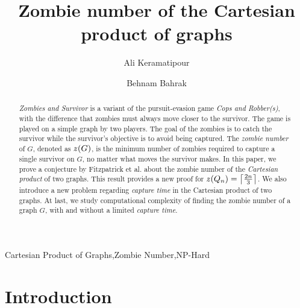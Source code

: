 \documentclass[1p]{elsarticle}
\DeclarePairedDelimiter\ceil{\lceil}{\rceil} \DeclarePairedDelimiter\floor{\lfloor}{\rfloor}
\newcommand{\zn}{\ooalign{$z$\cr\hfil\rule[.5ex]{.2em}{.08ex}\hfil\cr}}
\begin{document}
	
	\begin{frontmatter}
		
		\title{Zombie number of the Cartesian product of graphs}
		
		
		\author{Ali Keramatipour}
		
		\author{Behnam Bahrak}
		
		\address{School of Electrical and Computer Engineering, College of Engineering, University of Tehran, Tehran, Iran}
		
		\begin{abstract}
		{\it Zombies and Survivor} is a variant of the pursuit-evasion game {\it Cops and Robber(s)}, with the
		difference that zombies must always move closer to the survivor. The game is played on a simple graph by two
		players. The goal of the zombies is to catch the survivor while the survivor's objective is to avoid being
		captured. The {\it zombie number} of $G$, denoted as $\zn(G)$, is the minimum number of zombies required to
		capture a single survivor on $G$, no matter what moves the survivor makes. In this paper, we prove a conjecture
		by Fitzpatrick et al.\cite{Fitz16} about the zombie number of the {\it Cartesian product} of two graphs. This
		result provides a new proof for $\zn(Q_n) = \ceil*{\frac{2n}{3}}$. We also introduce a new problem regarding
		{\it capture time} in the Cartesian product of two graphs. At last, we study computational complexity of finding
		the zombie number of a graph $G$, with and without a limited {\it capture time}.
		\end{abstract}
		
		\begin{keyword}
			Cartesian Product of Graphs\sep Zombie Number\sep NP-Hard
		\end{keyword}
		
	\end{frontmatter}
	
\section{Introduction}\label{section-introduction}
\end{document}
